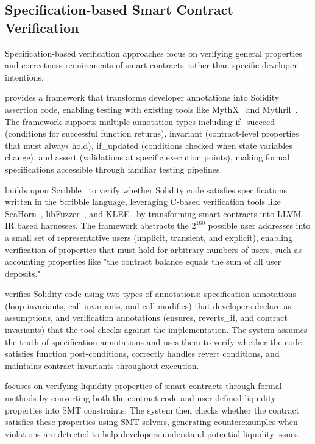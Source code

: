 \documentclass[pdflatex,sn-basic]{sn-jnl}%
\theoremstyle{thmstyleone}%
\theoremstyle{thmstyletwo}%
\theoremstyle{thmstylethree}%
\begin{document}
\subsection{Specification-based Smart Contract Verification}
Specification-based verification approaches focus on verifying general properties and correctness requirements of smart contracts rather than specific developer intentions.

\citep{scribble} provides a framework that transforms developer annotations into Solidity assertion code,
enabling testing with existing tools like MythX~\citep{mythx} and Mythril~\citep{mythril}.
The framework supports multiple annotation types including if\_succeed (conditions for successful function returns),
invariant (contract-level properties that must always hold), if\_updated (conditions checked when state variables change),
and assert (validations at specific execution points), making formal specifications accessible through familiar testing pipelines.

\citep{smartace} builds upon Scribble~\citep{scribble} to verify whether Solidity code satisfies specifications written in the Scribble language,
leveraging C-based verification tools like SeaHorn~\citep{seahorn}, libFuzzer~\citep{libfuzzer}, and KLEE~\citep{klee} by transforming smart contracts into LLVM-IR based harnesses.
The framework abstracts the $2^{160}$ possible user addresses into a small set of representative users (implicit, transient, and explicit),
enabling verification of properties that must hold for arbitrary numbers of users, such as accounting properties like
"the contract balance equals the sum of all user deposits."

\citep{idealist} verifies Solidity code using two types of annotations: specification annotations (loop invariants, call invariants, and call modifies) that developers declare as assumptions,
and verification annotations (ensures, reverts\_if, and contract invariants) that the tool checks against the implementation.
The system assumes the truth of specification annotations and uses them to verify whether the code satisfies function post-conditions,
correctly handles revert conditions, and maintains contract invariants throughout execution.

\citep{solvent} focuses on verifying liquidity properties of smart contracts through formal methods
by converting both the contract code and user-defined liquidity properties into SMT constraints.
The system then checks whether the contract satisfies these properties using SMT solvers,
generating counterexamples when violations are detected to help developers understand potential liquidity issues.
\end{document}
